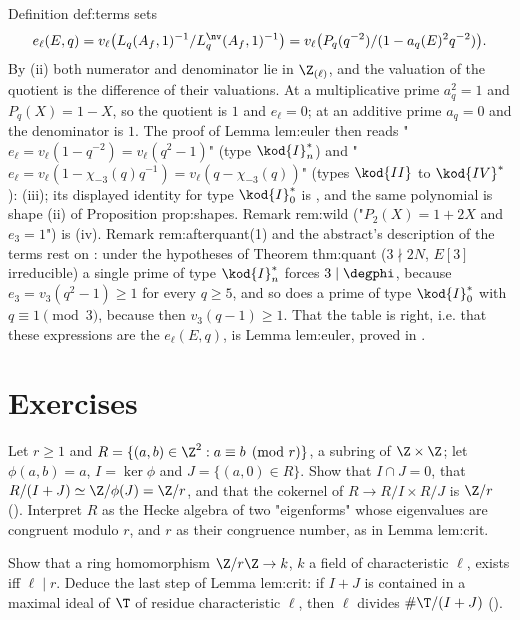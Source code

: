 \begin{paperlink}\label{pl:rings:terms}
Definition def:terms sets
\[
e_\ell(E,q)=v_\ell\bigl(L_q(A_f,1)^{-1}/L_q^{\nv}(A_f,1)^{-1}\bigr)=v_\ell\bigl(P_q(q^{-2})/(1-a_q(E)^2q^{-2})\bigr).
\]
By (ii)
both numerator and denominator lie in $\Z_{(\ell)}$, and the valuation of the quotient is the difference of their valuations. At a multiplicative prime
$a_q^2=1$ and $P_q(X)=1-X$, so the quotient is $1$ and $e_\ell=0$; at an additive prime $a_q=0$ and the denominator is $1$. The proof of Lemma
lem:euler then reads "$e_\ell=v_\ell(1-q^{-2})=v_\ell(q^2-1)$" (type $\kod{I}_n^*$) and "$e_\ell=v_\ell(1-\chi_{-3}(q)q^{-1})=v_\ell(q-\chi_{-3}(q))$" (types $\kod{II}$ to
$\kod{IV}^*$): (iii); its displayed identity for type $\kod{I}_0^*$ is , and the same polynomial
is shape (ii) of Proposition prop:shapes. Remark rem:wild ("$P_2(X)=1+2X$ and $e_3=1$") is (iv). Remark
rem:afterquant(1) and the abstract's description of the terms rest on : under the hypotheses of Theorem thm:quant
($3\nmid2N$, $E[3]$ irreducible) a single prime of type $\kod{I}_n^*$ forces $3\mid\degphi$, because $e_3=v_3(q^2-1)\ge1$ for every $q\ge5$, and so does a prime of
type $\kod{I}_0^*$ with $q\equiv1\pmod3$, because then $v_3(q-1)\ge1$. That the table is right, i.e. that these
expressions are the $e_\ell(E,q)$, is Lemma lem:euler, proved in .
\end{paperlink}

\section{Exercises}\label{sec:rings:exercises}

\begin{exercise}\label{ex:rings:toy-hecke}
Let $r\ge1$ and $R=\{(a,b)\in\Z^2:a\equiv b\pmod r\}$, a subring of $\Z\times\Z$; let $\phi(a,b)=a$, $I=\ker\phi$ and $J=\{(a,0)\in R\}$. Show that $I\cap J=0$, that
$R/(I+J)\simeq\Z/\phi(J)=\Z/r$, and that the cokernel of $R\to R/I\times R/J$ is $\Z/r$ (). Interpret $R$ as the
Hecke algebra of two "eigenforms" whose eigenvalues are congruent modulo $r$, and $r$ as their congruence number, as in Lemma lem:crit.
\end{exercise}

\begin{exercise}\label{ex:rings:residue}
Show that a ring homomorphism $\Z/r\Z\to k$, $k$ a field of characteristic $\ell$, exists iff $\ell\mid r$. Deduce the last step of Lemma lem:crit: if
$I+J$ is contained in a maximal ideal of $\T$ of residue characteristic $\ell$, then $\ell$ divides $\#\T/(I+J)$ ().
\end{exercise}


